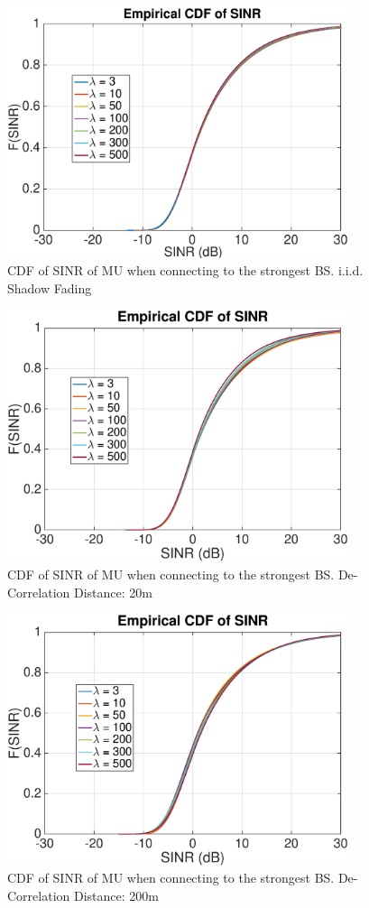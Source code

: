  \begin{figure}
 \centering
 \includegraphics[width=10cm]{MaxMax1000OutageProbCDFiid.eps}
 \caption{CDF of SINR of MU when connecting to the strongest BS. i.i.d. Shadow Fading}
 \label{4:Mode12}
 \end{figure}
 \begin{figure}
 \centering
 \includegraphics[width=10cm]{MaxMax1000OutageProbCDFDeCorr20.eps}
 \caption{CDF of SINR of MU when connecting to the strongest BS. De-Correlation Distance: 20m}
 \label{4:Mode22}
 \end{figure}
 \begin{figure}
 \centering
 \includegraphics[width=10cm]{MaxMax1000OutageProbCDFDeCorr200.eps}
 \caption{CDF of SINR of MU when connecting to the strongest BS. De-Correlation Distance: 200m}
 \label{4:Mode32}
 \end{figure}

